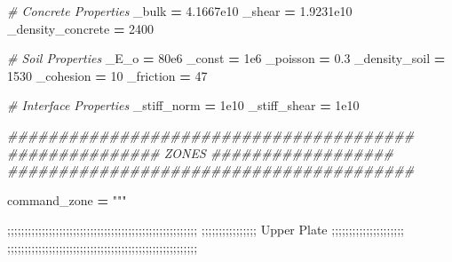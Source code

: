 \documentclass[a4paper, nobind]{templates/ociamthesis}
\newenvironment{Shaded}{\begin{snugshade}}{\end{snugshade}}
\newcommand{\CommentTok}[1]{\textcolor[rgb]{0.56,0.35,0.01}{\textit{#1}}}
\newcommand{\DecValTok}[1]{\textcolor[rgb]{0.00,0.00,0.81}{#1}}
\newcommand{\FloatTok}[1]{\textcolor[rgb]{0.00,0.00,0.81}{#1}}
\newcommand{\NormalTok}[1]{#1}
\newcommand{\OperatorTok}[1]{\textcolor[rgb]{0.81,0.36,0.00}{\textbf{#1}}}
\newcommand{\StringTok}[1]{\textcolor[rgb]{0.31,0.60,0.02}{#1}}
\renewenvironment{Shaded}
{
  \vspace{10pt}%
  \begin{snugshade}%
}{%
  \end{snugshade}%
  \vspace{8pt}%
}
\begin{document}
\begin{Shaded}
\begin{Highlighting}[]
\CommentTok{\# Concrete Properties}
\NormalTok{\_bulk }\OperatorTok{=} \FloatTok{4.1667e10}
\NormalTok{\_shear }\OperatorTok{=} \FloatTok{1.9231e10} 
\NormalTok{\_density\_concrete }\OperatorTok{=} \DecValTok{2400}

\CommentTok{\# Soil Properties}
\NormalTok{\_E\_o }\OperatorTok{=} \FloatTok{80e6}
\NormalTok{\_const }\OperatorTok{=} \FloatTok{1e6}
\NormalTok{\_poisson }\OperatorTok{=} \FloatTok{0.3}
\NormalTok{\_density\_soil }\OperatorTok{=} \DecValTok{1530}
\NormalTok{\_cohesion }\OperatorTok{=} \DecValTok{10}
\NormalTok{\_friction }\OperatorTok{=} \DecValTok{47}

\CommentTok{\# Interface Properties}
\NormalTok{\_stiff\_norm }\OperatorTok{=} \FloatTok{1e10}
\NormalTok{\_stiff\_shear }\OperatorTok{=} \FloatTok{1e10}

\CommentTok{\#\#\#\#\#\#\#\#\#\#\#\#\#\#\#\#\#\#\#\#\#\#\#\#\#\#\#\#\#\#\#\#\#\#\#\#\#\#\#\#}
\CommentTok{\#\#\#\#\#\#\#\#\#\#\#\#\#\#\# ZONES \#\#\#\#\#\#\#\#\#\#\#\#\#\#\#\#\#\#}
\CommentTok{\#\#\#\#\#\#\#\#\#\#\#\#\#\#\#\#\#\#\#\#\#\#\#\#\#\#\#\#\#\#\#\#\#\#\#\#\#\#\#\#}


\NormalTok{command\_zone }\OperatorTok{=} \StringTok{"""}

\StringTok{;;;;;;;;;;;;;;;;;;;;;;;;;;;;;;;;;;;;;;;;;;;;;;;;;;;;;;;}
\StringTok{;;;;;;;;;;;;;;;;   Upper Plate    ;;;;;;;;;;;;;;;;;;;;;}
\StringTok{;;;;;;;;;;;;;;;;;;;;;;;;;;;;;;;;;;;;;;;;;;;;;;;;;;;;;;;}


\end{Highlighting}
\end{Shaded}
\end{document}
